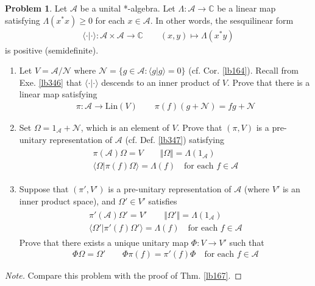 \documentclass[12pt,b5paper,notitlepage]{article}
\theoremstyle{definition}
\newtheorem{prob}{\color{red}Problem}[section]
\theoremstyle{plain}
\newcommand{\bk}[1]{\langle {#1}\rangle}
\newcommand{\scr}{\mathscr}
\newcommand{\Cbb}{\mathbb C}
\newcommand{\Lin}{\mathrm{Lin}}
\newcommand{\SA}{\mathscr A}
\numberwithin{equation}{section}
\begin{document}
\begin{prob}\label{lb348}
Let $\SA$ be a unital *-algebra. Let $\Lambda:\SA\rightarrow\Cbb$ be a linear map satisfying $\Lambda(x^*x)\geq0$ for each $x\in\SA$. In other words, the sesquilinear form
\begin{gather}\label{eq182}
\bk{\cdot|\cdot}:\SA\times\SA\rightarrow\Cbb\qquad (x,y)\mapsto \Lambda(x^*y)
\end{gather}
is positive (semidefinite).
\begin{enumerate}
\item Let $V=\SA/\scr N$ where $\scr N=\{g\in\SA:\bk{g|g}=0\}$ (cf. Cor. \ref{lb164}). Recall from Exe. \ref{lb346} that $\bk{\cdot|\cdot}$ descends to an inner product of $V$. Prove that there is a linear map satisfying
\begin{align*}
\pi:\SA\rightarrow\Lin(V)\qquad \pi(f)(g+\scr N)=fg+\scr N
\end{align*}
\item Set $\Omega=1_{\scr A}+\scr N$, which is an element of $V$. Prove that $(\pi,V)$ is a pre-unitary representation of $\SA$ (cf. Def. \ref{lb347}) satisfying 
\begin{gather}
\begin{gathered}
\pi(\SA)\Omega=V\qquad \Vert\Omega\Vert=\Lambda(1_\SA)\\
\bk{\Omega|\pi(f)\Omega}=\Lambda(f)\quad\text{for each }f\in\SA
\end{gathered}
\end{gather}
\item Suppose that $(\pi',V')$ is a pre-unitary representation of $\SA$ (where $V'$ is an inner product space), and $\Omega'\in V'$ satisfies
\begin{gather}
\begin{gathered}
\pi'(\SA)\Omega'=V'\qquad \Vert\Omega'\Vert=\Lambda(1_\SA)\\
\bk{\Omega'|\pi'(f)\Omega'}=\Lambda(f)\quad\text{for each }f\in\SA
\end{gathered}
\end{gather}
Prove that there exists a unique unitary map $\Phi:V\rightarrow V'$ such that
\begin{gather*}
\Phi\Omega=\Omega'\qquad \Phi\pi(f)=\pi'(f)\Phi\quad\text{for each }f\in\SA
\end{gather*}
\end{enumerate}
\end{prob}

\begin{proof}[Note]
Compare this problem with the proof of Thm. \ref{lb167}.
\end{proof}
\end{document}

